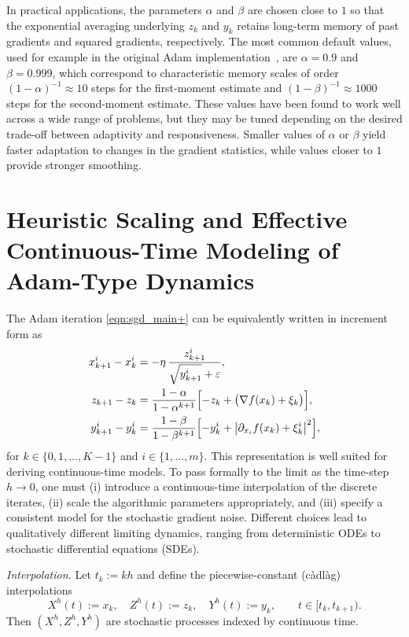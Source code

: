 \documentclass[11pt, a4paper,leqno]{amsart}
\theoremstyle{definition}
\numberwithin{equation}{section}
\begin{document}
In practical applications, the parameters $\alpha$ and $\beta$ are chosen close to $1$ so that the exponential averaging underlying $z_k$ and $y_k$ retains long-term memory of past gradients and squared gradients, respectively. The most common default values, used for example in the original Adam implementation~\cite{KingmaBa2015}, are $\alpha = 0.9$ and $\beta = 0.999$, which correspond to characteristic memory scales of order $(1-\alpha)^{-1} \approx 10$ steps for the first-moment estimate and $(1-\beta)^{-1} \approx 1000$ steps for the second-moment estimate. These values have been found to work well across a wide range of problems, but they may be tuned depending on the desired trade-off between adaptivity and responsiveness. Smaller values of $\alpha$ or $\beta$ yield faster adaptation to changes in the gradient statistics, while values closer to $1$ provide stronger smoothing.



\section{Heuristic Scaling and Effective Continuous-Time Modeling of Adam-Type Dynamics}\label{heur}

The Adam iteration \eqref{eqn:sgd_main+} can be equivalently written in increment form as
\begin{align}\label{eqn:sgd_main++}
x_{k+1}^i - x_k^i &= -\eta\,\frac{z_{k+1}^i}{\sqrt{y_{k+1}^i} + \varepsilon},\notag\\
z_{k+1} - z_k &= \frac{1-\alpha}{1-\alpha^{k+1}} \Bigl[ -z_k + \bigl( \nabla f(x_k) + \xi_k \bigr) \Bigr], \notag\\
y_{k+1}^i - y_k^i &= \frac{1-\beta}{1-\beta^{k+1}} \Bigl[ -y_k^i + \bigl| \partial_{x_i} f(x_k) + \xi_k^i \bigr|^2 \Bigr],
\end{align}
for $k \in \{0,1,\dots,K-1\}$ and $i \in \{1,\dots,m\}$. This representation is well suited for deriving continuous-time models. To pass formally to the limit as the time-step $h \to 0$, one must (i) introduce a continuous-time interpolation of the discrete iterates, (ii) scale the algorithmic parameters appropriately, and (iii) specify a consistent model for the stochastic gradient noise. Different choices lead to qualitatively different limiting dynamics, ranging from deterministic ODEs to stochastic differential equations (SDEs).

\smallskip
\noindent\emph{Interpolation.}
Let $t_k:=kh$ and define the piecewise-constant (càdlàg) interpolations
\[
X^h(t):=x_k,\quad Z^h(t):=z_k,\quad Y^h(t):=y_k,\qquad t\in[t_k,t_{k+1}).
\]
Then $(X^h,Z^h,Y^h)$ are stochastic processes indexed by continuous time.
\end{document}
